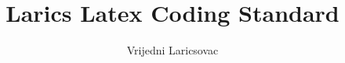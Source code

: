\documentclass[11pt]{article}
\begin{document}
\title{Larics Latex Coding Standard}
\author{Vrijedni Laricsovac}
\maketitle








\end{document}
